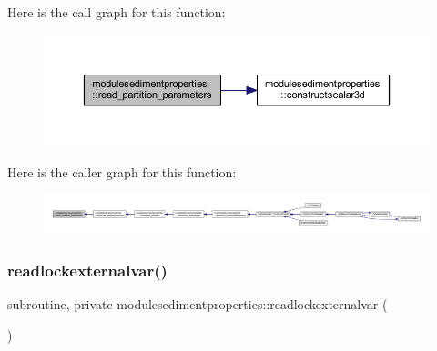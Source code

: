 Here is the call graph for this function\+:\nopagebreak
\begin{figure}[H]
\begin{center}
\leavevmode
\includegraphics[width=350pt]{namespacemodulesedimentproperties_afa4c90b28af961558ea18ba6ed05123b_cgraph}
\end{center}
\end{figure}
Here is the caller graph for this function\+:\nopagebreak
\begin{figure}[H]
\begin{center}
\leavevmode
\includegraphics[width=350pt]{namespacemodulesedimentproperties_afa4c90b28af961558ea18ba6ed05123b_icgraph}
\end{center}
\end{figure}
\mbox{\label{namespacemodulesedimentproperties_a395db65fca9389b9904d43f9fc450c03}} 
\subsubsection{\texorpdfstring{readlockexternalvar()}{readlockexternalvar()}}
{\footnotesize\ttfamily subroutine, private modulesedimentproperties\+::readlockexternalvar (\begin{DoxyParamCaption}{ }\end{DoxyParamCaption})\hspace{0.3cm}{\ttfamily [private]}}

